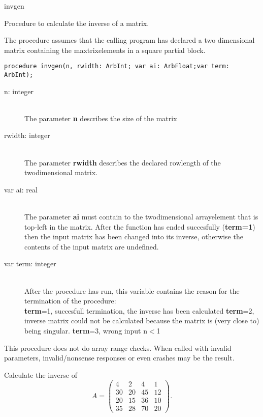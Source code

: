 \documentclass{report}
\newcommand{\FunctionDescription}{\item[Description]\rmfamily}
\newcommand{\Dataorganisation}{\item[Data Struct]\rmfamily}
\newcommand{\DeclarationandParams}{\item[Declaration]\rmfamily}
\newcommand{\Remarks}{\item[Remarks]\rmfamily}
\newcommand{\Example}{\item[Example]\rmfamily}
\begin{document}
\begin{procedure}{invgen}

\FunctionDescription

Procedure to calculate the inverse of a matrix.

\Dataorganisation

The procedure assumes that the calling program has declared a two dimensional
matrix containing the maxtrixelements in a square partial block.

\DeclarationandParams

\lstinline|procedure invgen(n, rwidth: ArbInt; var ai: ArbFloat;var term: ArbInt);|

\begin{description}
 \item[n: integer] \mbox{ } \\
    The parameter {\bf n} describes the size of the matrix
 \item[rwidth: integer] \mbox{} \\
    The parameter {\bf rwidth} describes the declared rowlength of the twodimensional
    matrix.
 \item[var ai: real] \mbox{} \\
    The parameter {\bf ai} must contain to the twodimensional arrayelement
    that is top-left in the matrix.
    After the function has ended succesfully (\textbf{term=1}) then 
    the input matrix has been changed into its inverse, otherwise the contents 
    of the input matrix are undefined.
 \item[var term: integer]  \mbox{} \\
    After the procedure has run, this variable contains the reason for 
    the termination of the procedure:\\
      {\bf term}=1, succesfull termination, the inverse has been calculated
      {\bf term}=2, inverse matrix could not be calculated because the matrix
		    is (very close to) being singular.
      {\bf term}=3, wrong input n$<$1
\end{description}
\Remarks
  This procedure does not do array range checks. When called with invalid
  parameters, invalid/nonsense responses or even crashes may be the result.

\Example

Calculate the inverse of 
\[
 A=
 \left(
 \begin{array}{rrrr}
   4 & 2 & 4 & 1  \\
  30 & 20 & 45 & 12 \\
  20 & 15 & 36 & 10 \\
  35 & 28 & 70 & 20
 \end{array}
 \right)
 .
\]


\end{procedure}
\end{document}
